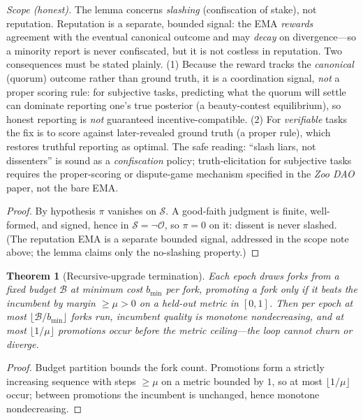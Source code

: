 \documentclass[11pt]{article}
\newtheorem{theorem}{Theorem}
\begin{document}
\noindent\emph{Scope (honest).} The lemma concerns \emph{slashing} (confiscation of stake), not reputation. Reputation is a separate, bounded signal: the EMA \emph{rewards} agreement with the eventual canonical outcome and may \emph{decay} on divergence---so a minority report is never confiscated, but it is not costless in reputation. Two consequences must be stated plainly. (1) Because the reward tracks the \emph{canonical} (quorum) outcome rather than ground truth, it is a coordination signal, \emph{not} a proper scoring rule: for subjective tasks, predicting what the quorum will settle can dominate reporting one's true posterior (a beauty-contest equilibrium), so honest reporting is \emph{not} guaranteed incentive-compatible. (2) For \emph{verifiable} tasks the fix is to score against later-revealed ground truth (a proper rule), which restores truthful reporting as optimal. The safe reading: ``slash liars, not dissenters'' is sound as a \emph{confiscation} policy; truth-elicitation for subjective tasks requires the proper-scoring or dispute-game mechanism specified in the \emph{Zoo DAO} paper, not the bare EMA.
\begin{proof}
By hypothesis $\pi$ vanishes on $\mathcal S$. A good-faith judgment is finite, well-formed, and signed, hence in $\mathcal S=\neg\mathcal O$, so $\pi=0$ on it: dissent is never slashed. (The reputation EMA is a separate bounded signal, addressed in the scope note above; the lemma claims only the no-slashing property.)
\end{proof}

\begin{theorem}[Recursive-upgrade termination]
\label{thm:recur}
Each epoch draws forks from a fixed budget $\mathcal{B}$ at minimum cost $b_{\min}$ per fork, promoting a fork only if it beats the incumbent by margin $\ge\mu>0$ on a held-out metric in $[0,1]$. Then per epoch at most $\lfloor\mathcal{B}/b_{\min}\rfloor$ forks run, incumbent quality is monotone nondecreasing, and at most $\lfloor1/\mu\rfloor$ promotions occur before the metric ceiling---the loop cannot churn or diverge.
\end{theorem}
\begin{proof}
Budget partition bounds the fork count. Promotions form a strictly increasing sequence with steps $\ge\mu$ on a metric bounded by $1$, so at most $\lfloor1/\mu\rfloor$ occur; between promotions the incumbent is unchanged, hence monotone nondecreasing.
\end{proof}
\end{document}
